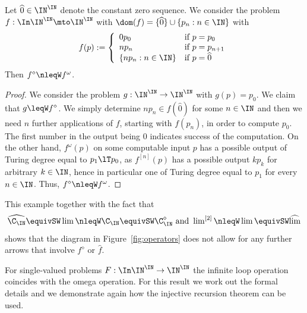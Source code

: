 \begin{exa}
\label{example:diamond-omega}
Let $\widehat{0}\in\IN^\IN$ denote the constant zero sequence. We consider the problem $f:\In\IN^\IN\mto\IN^\IN$
with $\dom(f)=\{\widehat{0}\}\cup\{p_n:n\in\IN\}$ with
\[f(p):=\left\{\begin{array}{ll}
0p_0 & \mbox{if $p=p_0$}\\
np_n & \mbox{if $p=p_{n+1}$}\\
\{np_n:n\in\IN\} & \mbox{if $p=\widehat{0}$}
\end{array}\right.\]
Then $f^\diamond\nleqW f^\omega$.
\end{exa}
\begin{proof}
We consider the problem $g:\IN^\IN\to\IN^\IN$ with $g(p)=p_0$. We claim that $g\leqW f^\diamond$.
We simply determine $np_n\in f(\widehat{0})$ for some $n\in\IN$ and then we need $n$ further applications of $f$, starting with $f(p_n)$,
in order to compute $p_0$. The first number in the output being $0$ indicates success of the computation.
On the other hand, $f^\omega(p)$ on some computable input $p$ has
a possible output of Turing degree equal to $p_1 \lT p_0$, as $f^{[n]}(p)$ has a possible output $kp_k$ for arbitrary $k\in\IN$, hence in particular one of Turing degree equal to $p_{1}$ for every $n\in\IN$. 
Thus, $f^\diamond\nleqW f^\omega$.
\end{proof}

\noindent
This example together with the fact that 
\[\widehat{\C_\IN}\equivSW\lim\nleqW\C_\IN\equivSW\C_\IN^\diamond\mbox{ and }\lim\nolimits^{[2]}\nleqW\lim\equivSW\widehat{\lim}\]
shows that the diagram in Figure~\ref{fig:operators} does not allow for any further arrows that involve
$f^\diamond$ or $\widehat{f}$.


For single-valued problems $F:\In\IN^\IN\to\IN^\IN$ the infinite loop operation coincides with the omega operation.
For this result we work out the formal details and we demonstrate again how the injective recursion theorem can be used.

